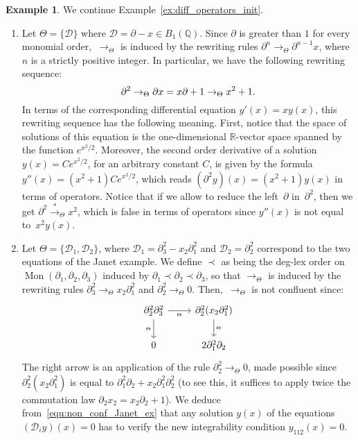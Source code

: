 \documentclass[11pt]{article}
\theoremstyle{definition}
\newtheorem{example}[theorem]{Example}
\newcommand\D{\mathcal{D}}
\newcommand\Q{\mathbb{Q}}
\newcommand\R{\mathbb{R}}
\newcommand\Weyl[1]{B_{#1}(\Q)}
\DeclareMathOperator{\Mon}{Mon}
\newcommand\rewTheta{\to_\Theta}
\newcommand\transTheta{\overset{*}{\to}_\Theta}
\begin{document}
\begin{example}\label{ex:diff_operators_rew}
  We continue Example~\ref{ex:diff_operators_init}.
  \begin{enumerate}
  \item\label{it:ODE_rew} Let $\Theta=\{\D\}$ where
    $\D=\partial-x\in\Weyl{1}$. Since $\partial$ is greater than $1$ for
    every monomial order,~$\rewTheta$ is induced by the rewriting rules
    $\partial^n\rewTheta \partial^{n-1}x$, where $n$ is a strictly
    positive integer. In particular, we have the following rewriting
    sequence:
    \[\partial^2\rewTheta\partial x=x\partial+1\rewTheta x^2+1.
    \smallskip\]
    In terms of the corresponding differential equation $y'(x)=xy(x)$,
    this rewriting sequence has the following meaning. First, notice that
    the space of solutions of this equation is the one-dimensional
    $\R$-vector space spanned by the function $e^{x^2/2}$. Moreover, the
    second order derivative of a solution $y(x)=Ce^{x^2/2}$, for an
    arbitrary constant $C$, is given by the formula
    $y''(x)=(x^2+1)Ce^{x^2/2}$, 
    which reads $(\partial^2y)(x)=(x^2+1)y(x)$ in terms of operators.
    Notice that if we allow to reduce the left~$\partial$ 
    in~$\partial^2$, then we get $\partial^2\transTheta x^2$, which is 
    false in terms of operators since $y''(x)$ is not equal to~$x^2y(x)$.
  \item\label{it:Janet_example_rew} Let $\Theta=\{\D_1,\D_2\}$, where
    $\D_1=\partial_3^2-x_2\partial_1^2$ and $\D_2=\partial_2^2$
    correspond to the two equations of the Janet example. We define
    $\prec$ as being the deg-lex order on
    $\Mon(\partial_1,\partial_2,\partial_3)$ induced by
    $\partial_1\prec\partial_2\prec\partial_3$, so that $\rewTheta$ is
    induced by the rewriting rules
    $\partial_3^2\rewTheta x_2\partial_1^2$ and
    $\partial_2^2\rewTheta 0$. Then,~$\rewTheta$ is not confluent since:
    \begin{equation}\label{equ:non_conf_Janet_ex}
      \begin{tikzcd}
        \partial_2^2\partial_3^2\ar[d, "_\Theta"']\ar[r, "_\Theta"'] &
        \partial_2^2(x_2\partial_1^2)\ar[d, "_\Theta"]\\
        0 & 2\partial_1^2\partial_2
      \end{tikzcd}
    \end{equation}
    The right arrow is an application of the rule
    $\partial_2^2 \rewTheta 0$, made possible since
    $\partial_2^2(x_2\partial_1^2)$ is equal to
    $\partial_1^2\partial_2+x_2\partial_1^2\partial_2^2$ (to see this, it
    suffices to apply twice the commutation law
    $\partial_2x_2=x_2\partial_2+1$).  We deduce
    from~\eqref{equ:non_conf_Janet_ex} that any solution $y(x)$ of the
    equations $(\D_iy)(x)=0$ has to verify the new integrability
    condition $y_{112}(x)=0$.
  \end{enumerate}
\end{example}
\smallskip
\end{document}
